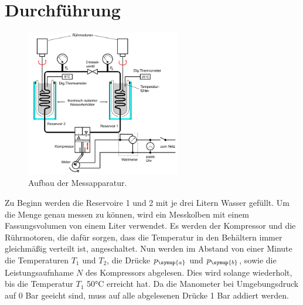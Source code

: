 \section{Durchführung}
\label{sec:Durchführung}
\begin{figure}
  \centering
  \includegraphics[width=0.60\textwidth]{messapparatur.png}
  \caption{Aufbau der Messapparatur.}
  \label{fig:aufbau}
\end{figure}
Zu Beginn werden die Reservoire 1 und 2 mit je drei Litern Wasser gefüllt. Um die
Menge genau messen zu können, wird ein Messkolben mit einem Fassungsvolumen von
einem Liter verwendet.
Es werden der Kompressor und die Rührmotoren, die dafür sorgen, dass die Temperatur in
den Behältern immer gleichmäßig verteilt ist, angeschaltet.
Nun werden im Abstand von einer Minute die Temperaturen $T_1$ und $T_2$, die Drücke
$p_\symup{a}$ und $p_\symup{b}$, sowie die Leistungsaufnhame $N$ des Kompressors
abgelesen. Dies wird solange wiederholt, bis die Temperatur $T_1$ 50°C erreicht hat.
Da die Manometer bei Umgebungsdruck auf 0 Bar geeicht sind, muss auf alle abgelesenen
Drücke 1 Bar addiert werden.
